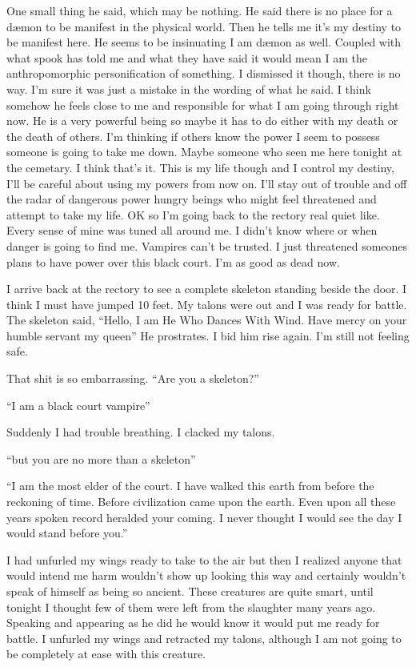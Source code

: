 One small thing he said, which may be nothing. He said there is no place for a d\ae mon to be manifest in the physical world. Then he tells me it's my destiny to be manifest here. He seems to be insinuating I am d\ae mon as well. Coupled with what spook has told me and what they have said it would mean I am the anthropomorphic personification of something. I dismissed it though, there is no way. I'm sure it was just a mistake in the wording of what he said. I think somehow he feels close to me and responsible for what I am going through right now. He is a very powerful being so maybe it has to do either with my death or the death of others. I'm thinking if others know the power I seem to possess someone is going to take me down. Maybe someone who seen me here tonight at the cemetary. I think that's it. This is my life though and I control my destiny, I'll be careful about using my powers from now on. I'll stay out of trouble and off the radar of dangerous power hungry beings who might feel threatened and attempt to take my life.
OK so I'm going back to the rectory real quiet like. Every sense of mine was tuned all around me. I didn't know where or when danger is going to find me. Vampires can't be trusted. I just threatened someones plans to have power over this black court. I'm as good as dead now.

I arrive back at the rectory to see a complete skeleton standing beside the door. I think I must have jumped 10 feet. My talons were out and I was ready for battle. The skeleton said, ``Hello, I am He Who Dances With Wind. Have mercy on your humble servant my queen'' He prostrates. I bid him rise again. I'm still not feeling safe.

That shit is so embarrassing. ``Are you a skeleton?''

``I am a black court vampire''

Suddenly I had trouble breathing. I clacked my talons.

``but you are no more than a skeleton''

``I am the most elder of the court. I have walked this earth from before the reckoning of time. Before civilization came upon the earth. Even upon all these years spoken record heralded your coming. I never thought I would see the day I would stand before you.''

I had unfurled my wings ready to take to the air but then I realized anyone that would intend me harm wouldn't show up looking this way and certainly wouldn't speak of himself as being so ancient. These creatures are quite smart, until tonight I thought few of them were left from the slaughter many years ago. Speaking and appearing as he did he would know it would put me ready for battle. I unfurled my wings and retracted my talons, although I am not going to be completely at ease with this creature.

